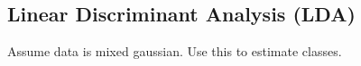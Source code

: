 
\subsection{Linear Discriminant Analysis (LDA)}

Assume data is mixed gaussian. Use this to estimate classes.

